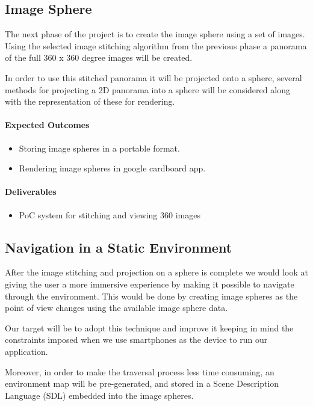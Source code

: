\subsection{Image Sphere}
\label{intro_subsec:3_2}

The next phase of the project is to create the image sphere using a set of images. Using the selected image stitching algorithm from the previous phase a panorama of the full 360 x 360 degree images will be created. 

In order to use this stitched panorama it will be projected onto a sphere, several methods for projecting a 2D panorama into a sphere will be considered along with the representation of these for rendering.

\paragraph{\textbf{Expected Outcomes}}
\begin{itemize}
\item{Storing image spheres in a portable format.}
\item{Rendering image spheres in google cardboard app.}
\end{itemize}

\paragraph{\textbf{Deliverables}}
\begin{itemize}
\item{PoC system for stitching and viewing 360 images}
\end{itemize}

\subsection{Navigation in a Static Environment}
\label{intro_subsec:3_3}

After the image stitching and projection on a sphere is complete we would look at giving the user a more immersive experience by making it possible to navigate through the environment. This would be done by creating image spheres as the point of view changes using the available image sphere data.

Our target will be to adopt this technique and improve it keeping in mind the constraints imposed when we use smartphones as the device to run our application.

Moreover, in order to make the traversal process less time consuming, an environment map will be pre-generated, and stored in a Scene Description Language (SDL) embedded into the image spheres.

